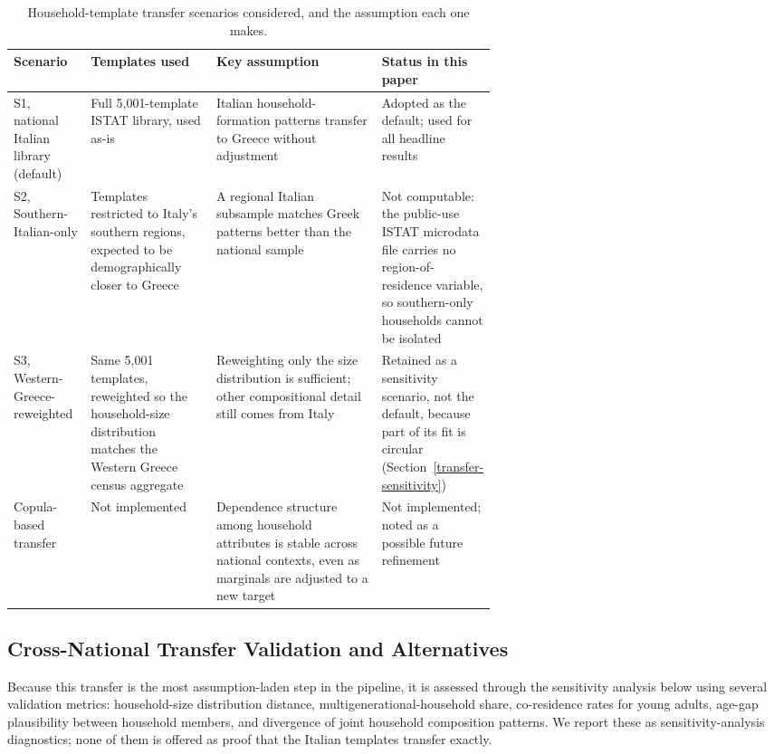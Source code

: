 \documentclass{article}
\begin{document}
\begin{table}[htbp]
\centering
\small
\begin{tabularx}{\textwidth}{@{}p{0.16\linewidth} p{0.26\linewidth} X p{0.2\linewidth}@{}}
\toprule
\textbf{Scenario} & \textbf{Templates used} & \textbf{Key assumption} & \textbf{Status in this paper} \\
\midrule
S1, national Italian library (default) &
Full 5,001-template ISTAT library, used as-is &
Italian household-formation patterns transfer to Greece without adjustment &
Adopted as the default; used for all headline results \\
S2, Southern-Italian-only &
Templates restricted to Italy's southern regions, expected to be demographically closer to Greece &
A regional Italian subsample matches Greek patterns better than the national sample &
Not computable: the public-use ISTAT microdata file carries no region-of-residence variable, so southern-only households cannot be isolated \\
S3, Western-Greece-reweighted &
Same 5,001 templates, reweighted so the household-size distribution matches the Western Greece census aggregate &
Reweighting only the size distribution is sufficient; other compositional detail still comes from Italy &
Retained as a sensitivity scenario, not the default, because part of its fit is circular (Section~\ref{transfer-sensitivity}) \\
Copula-based transfer &
Not implemented &
Dependence structure among household attributes is stable across national contexts, even as marginals are adjusted to a new target &
Not implemented; noted as a possible future refinement \\
\bottomrule
\end{tabularx}
\caption{Household-template transfer scenarios considered, and the assumption each one makes.}
\label{tab:transfer_scenarios}
\end{table}

\subsection{Cross-National Transfer Validation and Alternatives}\label{cross-national-transfer-validation-and-alternatives}

Because this transfer is the most assumption-laden step in the pipeline, it is assessed through the sensitivity analysis below using several validation metrics: household-size distribution distance, multigenerational-household share, co-residence rates for young adults, age-gap plausibility between household members, and divergence of joint household composition patterns. We report these as sensitivity-analysis diagnostics; none of them is offered as proof that the Italian templates transfer exactly.
\end{document}
